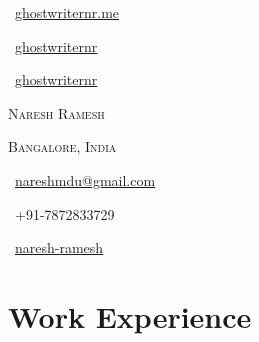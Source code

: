 \documentclass[a4paper,10pt]{extarticle} %
\begin{document}
\renewcommand{\baselinestretch}{1.3}\normalsize

\pagestyle{empty} %

\begin{center}
\begin{minipage}[b]{0.33333\textwidth}
\raggedright
\faGlobe\ {\href{https://ghostwriternr.me/}{ghostwriternr.me}}\par
\faGithub\ {\href{https://github.com/ghostwriternr}{ghostwriternr}}\par
\faGitlab\ {\href{https://gitlab.com/ghostwriternr}{ghostwriternr}}
\end{minipage}%
\begin{minipage}[b]{0.33333\textwidth}
\centering
\Huge\textsc{\textcolor{primary}{Naresh} Ramesh}\par
\large{\textsc{Bangalore, India}}
\end{minipage}%
\begin{minipage}[b]{0.33333\textwidth}
\raggedleft
\normalsize\faEnvelope\ {\href{mailto:nareshmdu@gmail.com}{nareshmdu@gmail.com}}\par
\faPhone\ +91-7872833729\par
\faLinkedinSquare\ {\href{https://www.linkedin.com/in/naresh-ramesh}{naresh-ramesh}}
\phantom{ }
\end{minipage}
\end{center}


\vspace{0.4cm}

\section{\textcolor{primary}{Work Experience}}
\end{document}
